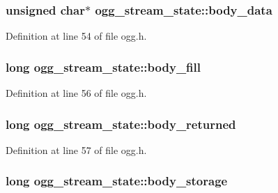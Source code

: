 \subsubsection[{\texorpdfstring{body\+\_\+data}{body_data}}]{\setlength{\rightskip}{0pt plus 5cm}unsigned char$\ast$ ogg\+\_\+stream\+\_\+state\+::body\+\_\+data}\hypertarget{structogg__stream__state_a70d03b6f99c1d1e57f55e800b087dae8}{}\label{structogg__stream__state_a70d03b6f99c1d1e57f55e800b087dae8}


Definition at line 54 of file ogg.\+h.

\subsubsection[{\texorpdfstring{body\+\_\+fill}{body_fill}}]{\setlength{\rightskip}{0pt plus 5cm}long ogg\+\_\+stream\+\_\+state\+::body\+\_\+fill}\hypertarget{structogg__stream__state_a19d45a7b5004f13ae02b5a9502354b93}{}\label{structogg__stream__state_a19d45a7b5004f13ae02b5a9502354b93}


Definition at line 56 of file ogg.\+h.

\subsubsection[{\texorpdfstring{body\+\_\+returned}{body_returned}}]{\setlength{\rightskip}{0pt plus 5cm}long ogg\+\_\+stream\+\_\+state\+::body\+\_\+returned}\hypertarget{structogg__stream__state_a602e02c9b0d5653eea5bd4f97bade116}{}\label{structogg__stream__state_a602e02c9b0d5653eea5bd4f97bade116}


Definition at line 57 of file ogg.\+h.

\subsubsection[{\texorpdfstring{body\+\_\+storage}{body_storage}}]{\setlength{\rightskip}{0pt plus 5cm}long ogg\+\_\+stream\+\_\+state\+::body\+\_\+storage}\hypertarget{structogg__stream__state_acc4cf19d7e31e1a6daab8f76fdb0afd6}{}\label{structogg__stream__state_acc4cf19d7e31e1a6daab8f76fdb0afd6}


